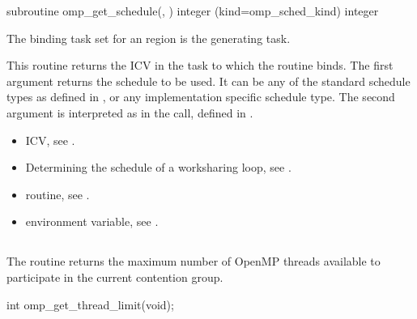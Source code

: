 \fortranspecificstart
\begin{boxedcode}
subroutine omp\_get\_schedule(, ) 
integer (kind=omp\_sched\_kind)  
integer 
\end{boxedcode}
\fortranspecificend

\binding
The binding task set for an  region is the generating task. 

\effect
This routine returns the  ICV in the task to which the routine binds. The 
first argument  returns the schedule to be used. It can be any of the standard 
schedule types as defined in 
, 
or any implementation specific 
schedule type. The second argument is interpreted as in the  call, 
defined in 
.

\crossreferences
\begin{itemize}
\item {} ICV, see 
.

\item Determining the schedule of a worksharing loop, see 
.

\item {} routine, see 
.

\item {} environment variable, see 
.
\end{itemize}









\subsection{}
\label{subsec:omp_get_thread_limit}
\summary
The  routine returns the maximum number of OpenMP 
threads available to participate in the current contention group. 

\format
\ccppspecificstart
\begin{boxedcode}
int omp\_get\_thread\_limit(void);
\end{boxedcode}
\ccppspecificend

